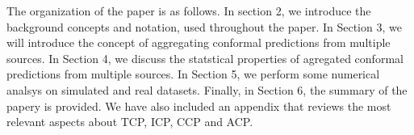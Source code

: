 \documentclass[main]{subfiles}
\begin{document}
The organization of the paper is as follows. In section 2, we introduce the background concepts and notation, used throughout the paper. In Section 3, we will introduce the concept of aggregating conformal predictions from multiple sources. In Section 4, we discuss the statstical properties of agregated conformal predictions from multiple sources. In Section 5, we perform some numerical analsys on simulated and real datasets. Finally, in Section 6, the summary of the papery is provided.
We have also included an appendix that reviews the most relevant aspects about TCP, ICP, CCP and ACP.
\end{document}
